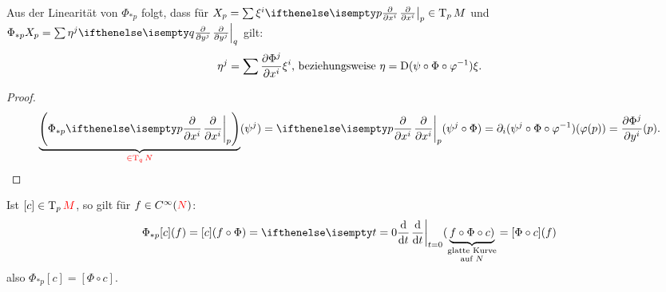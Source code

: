 \begin{bem}
  Aus der Linearität von $\Phi_{*p}$ folgt, dass für $X_p = \sum \xi^i\pdifffrac[p]{}{x^i} \in \T_pM$ und $\Phi_{*p}X_p = \sum \eta^j\pdifffrac[q]{}{y^j}$ gilt:
  \begin{align*}
    \eta^j = \sum \frac{\partial \Phi^j}{\partial x^i}\xi^i \text{, beziehungsweise } \eta = \operatorname{D}(\psi \circ \Phi \circ \varphi^{-1})\xi.
  \end{align*}
\end{bem}

\begin{proof}
  \begin{align*}
    \underbrace{\left(\Phi_{*p}\pdifffrac[p]{}{x^i}\right)}_{\textcolor{red}{\in \T_qN}}(\psi^j) = \pdifffrac[p]{}{x^i}(\psi^j \circ \Phi) = \partial_i (\psi^j \circ \Phi \circ \varphi^{-1})(\varphi(p)) = \frac{\partial \Phi^j}{\partial y^i}(p).
  \end{align*}
\end{proof}

\begin{bem}
  Ist $[c] \in \operatorname{T}_p\textcolor{red}{M}$, so gilt für $f \in C^{\infty}(\textcolor{red}{N})$:
  \begin{align*}
    \Phi_{*p}[c](f) = [c](f \circ \Phi) = \difffrac[t=0]{}{t}(\underbrace{f \circ \Phi \circ c)}_{\substack{\text{glatte Kurve}\\ \text{auf }N}} = [\Phi \circ c](f)
  \end{align*}
  also $\Phi_{*p}[c] = [\Phi \circ c]$.
\end{bem}

